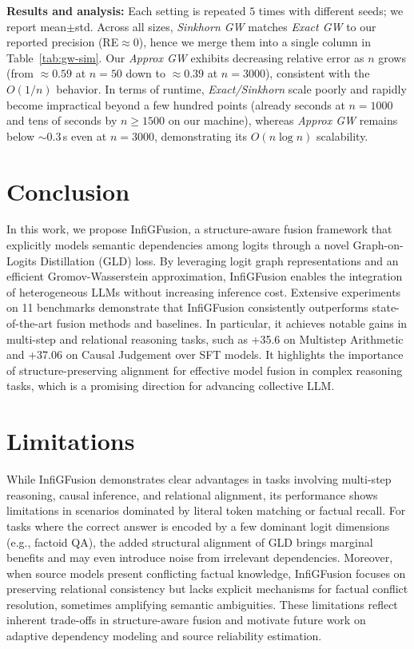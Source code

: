 \documentclass{article}
\begin{document}
\textbf{Results and analysis:}
Each setting is repeated $5$ times with different seeds; we report mean$\pm$std.
Across all sizes, \emph{Sinkhorn GW} matches \emph{Exact GW} to our reported precision (RE$\approx 0$), hence we merge them into a single column in Table~\ref{tab:gw-sim}.
Our \emph{Approx GW} exhibits decreasing relative error as $n$ grows (from $\approx 0.59$ at $n=50$ down to $\approx 0.39$ at $n=3000$), consistent with the $O(1/n)$ behavior.
In terms of runtime, \emph{Exact/Sinkhorn} scale poorly and rapidly become impractical beyond a few hundred points (already seconds at $n\!=\!1000$ and tens of seconds by $n\!\ge\!1500$ on our machine), whereas \emph{Approx GW} remains below $\sim 0.3$\,s even at $n\!=\!3000$, demonstrating its $O(n\log n)$ scalability.



\section{Conclusion}
In this work, we propose InfiGFusion, a structure-aware fusion framework that explicitly models semantic dependencies among logits through a novel Graph-on-Logits Distillation (GLD) loss. By leveraging logit graph representations and an efficient Gromov-Wasserstein approximation, InfiGFusion enables the integration of heterogeneous LLMs without increasing inference cost. Extensive experiments on 11 benchmarks demonstrate that InfiGFusion consistently outperforms state-of-the-art fusion methods and baselines. In particular, it achieves notable gains in multi-step and relational reasoning tasks, such as +35.6 on Multistep Arithmetic and +37.06 on Causal Judgement over SFT models. It highlights the importance of structure-preserving alignment for effective model fusion in complex reasoning tasks, which is a promising direction for advancing collective LLM.

\section*{Limitations}
\label{limitation}
While InfiGFusion demonstrates clear advantages in tasks involving multi-step reasoning, causal inference, and relational alignment, its performance shows limitations in scenarios dominated by literal token matching or factual recall. For tasks where the correct answer is encoded by a few dominant logit dimensions (e.g., factoid QA), the added structural alignment of GLD brings marginal benefits and may even introduce noise from irrelevant dependencies. Moreover, when source models present conflicting factual knowledge, InfiGFusion focuses on preserving relational consistency but lacks explicit mechanisms for factual conflict resolution, sometimes amplifying semantic ambiguities. These limitations reflect inherent trade-offs in structure-aware fusion and motivate future work on adaptive dependency modeling and source reliability estimation.
\end{document}
